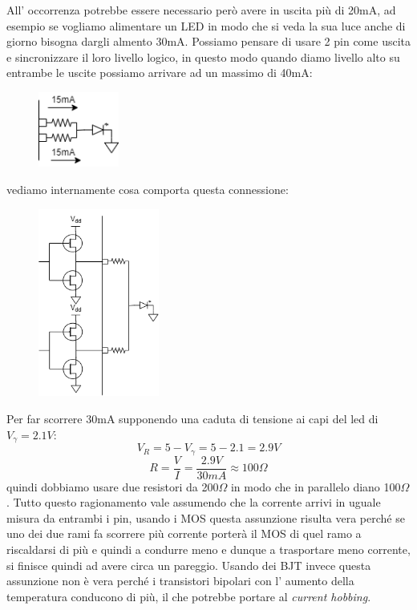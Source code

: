 All' occorrenza potrebbe essere necessario però avere in uscita più di 20mA, ad esempio se vogliamo alimentare un LED in modo che si veda la sua luce anche di giorno bisogna dargli almento 30mA.
Possiamo pensare di usare 2 pin come uscita e sincronizzare il loro livello logico, in questo modo quando diamo livello alto su entrambe le uscite possiamo arrivare ad un massimo di 40mA:
\begin{figure}[H]
    \centering
    \includegraphics[width=100px]{images/21_GPIO/pin_in_parallelo_led.png}
\end{figure}
vediamo internamente cosa comporta questa connessione:
\begin{figure}[H]
    \centering
    \includegraphics[width=150px]{images/21_GPIO/pin_in_parallelo_internal.png}
\end{figure}
Per far scorrere 30mA supponendo una caduta di tensione ai capi del led di $V_{\gamma} = 2.1V$:
$$ V_{R} = 5 - V_{\gamma} = 5-2.1 = 2.9V $$
$$ R = \frac{V}{I} = \frac{2.9V}{30mA} \approx 100 \Omega $$
quindi dobbiamo usare due resistori da 200$\Omega$ in modo che in parallelo diano 100$\Omega$.
Tutto questo ragionamento vale assumendo che la corrente arrivi in uguale misura da entrambi i pin, usando i MOS questa assunzione risulta vera perché se uno dei due rami fa scorrere più corrente porterà il MOS di quel ramo a riscaldarsi di più e quindi a condurre meno e dunque a trasportare meno corrente, si finisce quindi ad avere circa un pareggio.
Usando dei BJT invece questa assunzione non è vera perché i transistori bipolari con l' aumento della temperatura conducono di più, il che potrebbe portare al \emph{current hobbing}.

